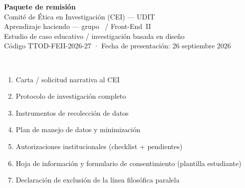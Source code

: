 \documentclass[11pt,a4paper]{scrartcl}
\begin{document}
\LogoRow

\begin{center}
  {\LARGE\sffamily\bfseries Paquete de remisión}\\[0.35em]
  {\Large\sffamily Comité de Ética en Investigación (CEI) --- UDIT}\\[0.8em]
  {\large\sffamily Aprendizaje haciendo --- grupo \TTODfull\ / Front-End~II}\\[0.3em]
  {\normalsize\color{uditnavy} Estudio de caso educativo / investigación basada en diseño}\\[0.6em]
  {\small Código TTOD-FEII-2026-27 · Fecha de presentación: 26 septiembre 2026}
\end{center}

\vspace{0.6em}
\StudyMetaPI

\vspace{0.55em}
\AuthoritiesBlock

\vspace{0.7em}
\\[0.3em]
\begin{enumerate}
  \item Carta / solicitud narrativa al CEI
  \item Protocolo de investigación completo
  \item Instrumentos de recolección de datos
  \item Plan de manejo de datos y minimización
  \item Autorizaciones institucionales (checklist + pendientes)
  \item Hoja de información y formulario de consentimiento (plantilla estudiante)
  \item Declaración de exclusión de la línea filosófica paralela
\end{enumerate}

\vspace{0.4em}

\vspace{0.5em}
\LegalEntities
\end{document}

